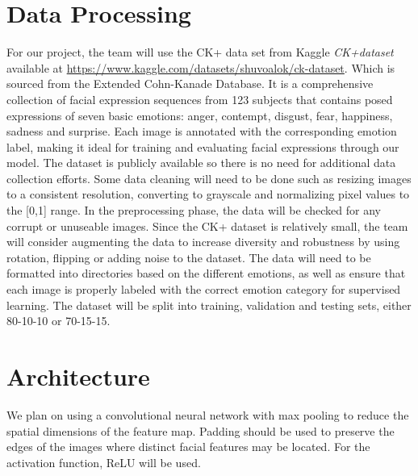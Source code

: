 \documentclass{article} %
\begin{document}
\section{Data Processing}
For our project, the team will use the CK+ data set from Kaggle
\textit{CK+dataset} \cite{Dev-ShuvoAlok} available at
\url{https://www.kaggle.com/datasets/shuvoalok/ck-dataset}. Which is sourced from the Extended Cohn-Kanade Database. It is a comprehensive collection of facial expression sequences from 123 subjects that contains posed expressions of seven basic emotions: anger, contempt, disgust, fear, happiness, sadness and surprise. Each image is annotated with the corresponding emotion label, making it ideal for training and evaluating facial expressions through our model. 
The dataset is publicly available so there is no need for additional data collection efforts.
Some data cleaning will need to be done such as resizing images to a consistent resolution, converting to grayscale and normalizing pixel values to the [0,1] range. In the preprocessing phase, the data will be checked for any corrupt or unuseable images.
Since the CK+ dataset is relatively small, the team will consider augmenting the data to increase diversity and robustness by using rotation, flipping or adding noise to the dataset.
The data will need to be formatted into directories based on the different emotions, as well as ensure that each image is properly labeled with the correct emotion category for supervised learning.
The dataset will be split into training, validation and testing sets, either 80-10-10 or 70-15-15.

\section{Architecture}
We plan on using a convolutional neural network with max pooling to reduce the spatial dimensions of the feature map. Padding should be used to preserve the edges of the images where distinct facial features may be located. For the activation function, ReLU will be used.
\end{document}
